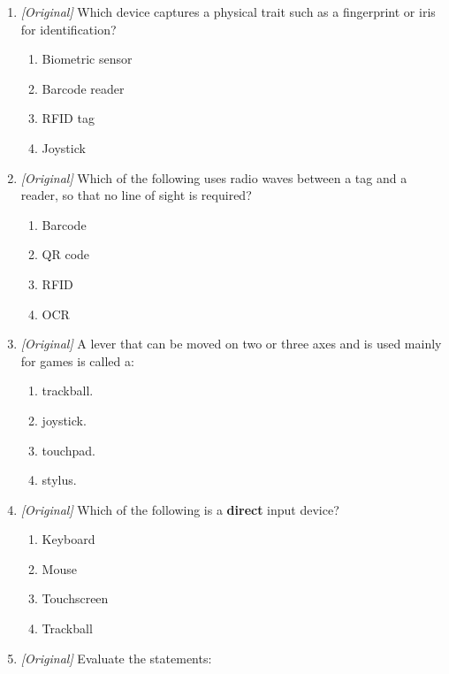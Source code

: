 \documentclass[11pt]{article}
\begin{document}
\begin{enumerate}[label=\textbf{Q\arabic*.}, leftmargin=*]
\begin{enumerate}[label=\Alph*.]
    \item audio input device.
    \item audio output device.
    \item image input device.
    \item pointing input device.
  \end{enumerate}
\item \textit{[Original]} Which device captures a physical trait such as a
  fingerprint or iris for identification?
  \begin{enumerate}[label=\Alph*.]
    \item Biometric sensor
    \item Barcode reader
    \item RFID tag
    \item Joystick
  \end{enumerate}
\item \textit{[Original]} Which of the following uses radio waves between a
  tag and a reader, so that no line of sight is required?
  \begin{enumerate}[label=\Alph*.]
    \item Barcode
    \item QR code
    \item RFID
    \item OCR
  \end{enumerate}
\item \textit{[Original]} A lever that can be moved on two or three axes and
  is used mainly for games is called a:
  \begin{enumerate}[label=\Alph*.]
    \item trackball.
    \item joystick.
    \item touchpad.
    \item stylus.
  \end{enumerate}
\item \textit{[Original]} Which of the following is a \textbf{direct} input
  device?
  \begin{enumerate}[label=\Alph*.]
    \item Keyboard
    \item Mouse
    \item Touchscreen
    \item Trackball
  \end{enumerate}
\item \textit{[Original]} Evaluate the statements:
  \begin{enumerate}[label=\Roman*.]

\end{enumerate}
\end{enumerate}
\end{document}
